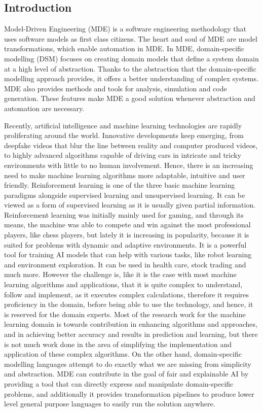 \documentclass[11pt,letterpaper]{ryersonSGSThesis}
\begin{document}
\begin{ryersonSGSThesis}

\chapter{Introduction}
\label{chap:Introduction}
    Model-Driven Engineering (MDE) \cite{Brambilla2017} is a software engineering methodology that uses software models as first class citizens. The heart and soul of MDE are model transformations, which enable automation in MDE. In MDE, domain-specific modelling (DSM) focuses on creating domain models that define a system domain at a high level of abstraction. Thanks to the abstraction that the domain-specific modelling approach provides, it offers a better understanding of complex systems. MDE also provides methods and tools for analysis, simulation and code generation. These features make MDE a good solution whenever abstraction and automation are necessary. 
    
    Recently, artificial intelligence and machine learning technologies are rapidly proliferating around the world. Innovative developments keep emerging, from deepfake videos that blur the line between reality and computer produced videos, to highly advanced algorithms capable of driving cars in intricate and tricky environments with little to no human involvement. Hence, there is an increasing need to make machine learning algorithms more adaptable, intuitive and user friendly. Reinforcement learning \cite{Brunton2019} is one of the three basic machine learning paradigms alongside supervised learning and unsupervised learning. It can be viewed as a form of supervised learning as it is usually given partial information. Reinforcement learning was initially mainly used for gaming, and through its means, the machine was able to compete and win against the most professional players, like chess players, but lately it is increasing in popularity, because it is suited for problems with dynamic and adaptive environments. It is a powerful tool for training AI models that can help with various tasks, like robot learning and environment exploration. It can be used in health care, stock trading and much more. However the challenge is, like it is the case with most machine learning algorithms and applications, that it is quite complex to understand, follow and implement, as it executes complex calculations, therefore it requires proficiency in the domain, before being able to use the technology, and hence, it is reserved for the domain experts. Most of the research work for the machine learning domain is towards contribution in enhancing algorithms and approaches, and in achieving better accuracy and results in prediction and learning, but there is not much work done in the area of simplifying the implementation and application of these complex algorithms. On the other hand, domain-specific modelling languages attempt to do exactly what we are missing from simplicity and abstraction. MDE can contribute in the goal of fair and explainable AI by providing a tool that can directly express and manipulate domain-specific problems, and additionally it provides transformation pipelines to produce lower level general purpose languages to easily run the solution anywhere.
 

\end{ryersonSGSThesis}
\end{document}
